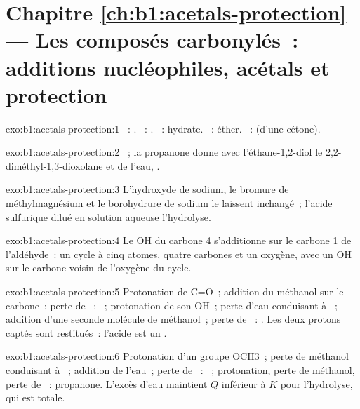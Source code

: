 \section*{Chapitre \ref{ch:b1:acetals-protection} --- Les composés carbonylés~: additions nucléophiles, acétals et protection}

\begin{solution}{exo:b1:acetals-protection:1}
~: . ~: .
~: hydrate. ~: éther. ~:
 (d'une cétone).
\end{solution}

\begin{solution}{exo:b1:acetals-protection:2}
~; la propanone donne
avec l'éthane-1,2-diol le 2,2-diméthyl-1,3-dioxolane et de l'eau,
.
\end{solution}

\begin{solution}{exo:b1:acetals-protection:3}
L'hydroxyde de sodium, le bromure de méthylmagnésium et le borohydrure
de sodium le laissent inchangé~; l'acide sulfurique dilué en solution
aqueuse l'hydrolyse.
\end{solution}

\begin{solution}{exo:b1:acetals-protection:4}
Le OH du carbone 4 s'additionne sur le carbone 1 de l'aldéhyde~: un
cycle à cinq atomes, quatre carbones et un oxygène, avec un OH sur le
carbone voisin de l'oxygène du cycle.
\end{solution}

\begin{solution}{exo:b1:acetals-protection:5}
Protonation de C=O~; addition du méthanol sur le carbone~; perte de
~: ~; protonation de son OH~; perte d'eau conduisant à
~; addition d'une seconde molécule de méthanol~; perte
de ~: . Les deux protons captés sont restitués~:
l'acide est un .
\end{solution}

\begin{solution}{exo:b1:acetals-protection:6}
Protonation d'un groupe OCH3~; perte de méthanol conduisant à
~; addition de l'eau~;
perte de ~: ~; protonation, perte de méthanol, perte de
~: propanone. L'excès d'eau maintient $Q$ inférieur à $K$ pour
l'hydrolyse, qui est totale.
\end{solution}

